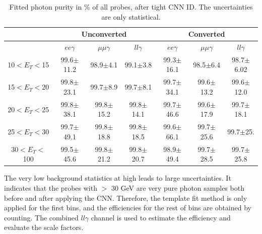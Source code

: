 \begin{table}[ht]
\raggedleft
\begin{longtable}[c]{ccccccc}
\hline\hline
                             & \multicolumn{3}{c}{Unconverted}               & \multicolumn{3}{c}{Converted}                \\
                            \hline
\endfirsthead
%
\endhead
%
                             & $ee\gamma$           & $\mu\mu\gamma$           & $ll\gamma$           & $ee\gamma$           &  $\mu\mu\gamma$          & $ll\gamma$           \\
    \hline
10$<E_T<$15 & 99.6$\pm$11.2    & 98.9$\pm$4.1       & 99.1$\pm$3.8    & 99.3$\pm$16.1    & 98.5$\pm$6.4     & 98.7$\pm$6.02  \\
15$<E_T<$20 & 99.8$\pm$23.1    & 99.7$\pm$8.9       & 99.7$\pm$8.1    & 99.7$\pm$34.1    & 99.6$\pm$13.2    & 99.6$\pm$12.0 \\
20$<E_T<$25 & 99.8$\pm$38.1    & 99.8$\pm$15.2      & 99.8$\pm$14.1   & 99.7$\pm$46.6    & 99.6$\pm$17.9    & 99.7$\pm$18.1  \\
25$<E_T<$30  & 99.7$\pm$49.1   & 99.8$\pm$18.8      & 99.8$\pm$18.5   & 99.6$\pm$66.1    & 99.7$\pm$25.6    & 99.7$\pm$25.    \\
30$<E_T<$100 & 99.5$\pm$45.6   & 99.8$\pm$21.2      & 99.8$\pm$20.7   & 98.9$\pm$49.4    & 99.7$\pm$28.5    & 99.7$\pm$25.8     \\
\hline\hline
\end{longtable}
\begin{tcolorbox}[colback=black!5!white,colframe=white!75!black]
\caption{Fitted photon purity in \%  of all probes, after tight CNN ID. The uncertainties are only statistical.}
\label{tab:gamma:CNN:Zllg:Purity:A}
\end{tcolorbox}

\end{table}
The very low background statistics at high \pT leads to large uncertainties. It indicates that the probes with \pT$>$ 30 GeV are very pure photon samples both before and after applying the CNN. Therefore, the template fit method is only applied for the first \pT bins, and the efficiencies for the rest of bins are obtained by counting. The combined $ll\gamma$ channel is used to estimate the efficiency and evaluate the scale factors.   


